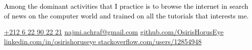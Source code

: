 \documentclass[darkpython]{hipstercv}
\newlength{\rightcolwidth}
\begin{document}
\begin{paracol}{2}
\begin{minipage}[t]{0.65\textwidth}
{	\parbox[b][2.2cm][c]{5cm}{
			\textcolor{black}{Among the dominant activities that I practice is to browse the internet in search of news on the computer world and trained on all the tutorials that interests me.}
		}
	}
\end{minipage}









\vfill{} %

\setlength{\parindent}{0pt}
\begin{minipage}[t]{\rightcolwidth}
\begin{center}\fontfamily{\sfdefault}\selectfont \color{black!70}
{\href{callto:+212622902221}{ \textcolor{black!70}{+212 6 22 90 22 21}} \href{mailto:najmi.achraf@gmail.com}{ \textcolor{black!70}{najmi.achraf@gmail.com}} \href{https://www.github.com/OsirisHorusEye}{ \textcolor{black!70}{github.com/OsirisHorusEye}} \newline\href{https://www.linkedin.com/in/osirishoruseye}{ \textcolor{black!70}{linkedin.com/in/osirishoruseye}}\href{https://stackoverflow.com/users/12854948}{ \textcolor{black!70}{stackoverflow.com/users/12854948}}
}
\end{center}\vspace{-2em}
\end{minipage}


\end{paracol}
\end{document}
